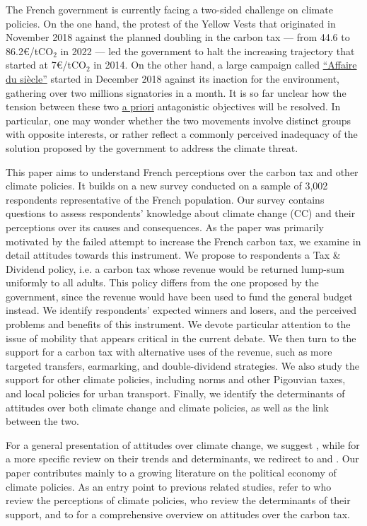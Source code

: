 \documentclass[english,5p,authoryear]{elsarticle}
\begin{document}
The French government is currently facing a two-sided challenge on climate policies. On the one hand, the protest of the Yellow Vests that originated in November 2018 against the planned doubling in the carbon tax  --- from 44.6 to 86.2\euro{}/tCO$_2$ in 2022 --- led the government to halt the increasing trajectory that started at 7\euro{}/tCO$_2$ in 2014. On the other hand, a large campaign called \href{https://laffairedusiecle.net/}{``Affaire du siècle''} started in December 2018 against its inaction for the environment, gathering over two millions signatories in a month. It is so far unclear how the tension between these two \uline{a priori} antagonistic objectives will be resolved. In particular, one may wonder whether the two movements involve distinct groups with opposite interests, or rather reflect a commonly perceived inadequacy of the solution proposed by the government to address the climate threat.

%

This paper aims to understand French perceptions over the carbon tax and other climate policies. It builds on a new survey conducted on a sample of 3,002 respondents representative of the French population. Our survey contains questions to assess respondents' knowledge about climate change (CC) and their perceptions over its causes and consequences. As the paper was primarily motivated by the failed attempt to increase the French carbon tax, we examine in detail attitudes towards this instrument. We propose to respondents a Tax \& Dividend policy, i.e. a carbon tax whose revenue would be returned lump-sum uniformly to all adults. This policy differs from the one proposed by the government, since the revenue would have been used to fund the general budget instead. We identify respondents' expected winners and losers, and the perceived problems and benefits of this instrument. We devote particular attention to the issue of mobility that appears critical in the current debate. We then turn to the support for a carbon tax with alternative uses of the revenue, such as more targeted transfers, earmarking, and double-dividend strategies. We also study the support for other climate policies, including norms and other Pigouvian taxes, and local policies for urban transport. Finally, we identify the determinants of attitudes over both climate change and climate policies, as well as the link between the two.
%
%

%
%

%
For a general presentation of attitudes over climate change, we suggest \citet{whitmarsh_2_2018}, while for a more specific review on their trends and determinants, we redirect to \citet{brechin_public_2010} and \citet{ziegler_political_2017}. Our paper contributes mainly to a growing literature on the political economy of climate policies. As an entry point to previous related studies, refer to \citet{maestre-andres_perceived_2019} who review the perceptions of climate policies, \citet{drews_van_der_bergh_2016} who review the determinants of their support, and to \citet{carattini_overcoming_2018} for a comprehensive overview on attitudes over the carbon tax. 
%
\end{document}
